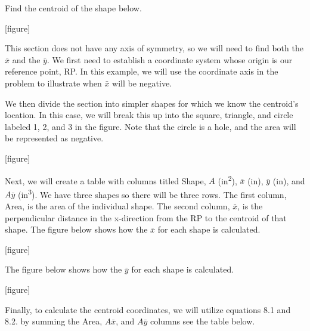 \documentclass[
  letterpaper,
  DIV=11,
  numbers=noendperiod]{scrreprt}
\begin{document}
\begin{tcolorbox}[enhanced jigsaw, breakable, opacityback=0, toptitle=1mm, left=2mm, colback=white, opacitybacktitle=0.6, colframe=quarto-callout-tip-color-frame, titlerule=0mm, arc=.35mm, leftrule=.75mm, bottomtitle=1mm, colbacktitle=quarto-callout-tip-color!10!white, rightrule=.15mm, title={Example 8.3}, bottomrule=.15mm, toprule=.15mm, coltitle=black]

Find the centroid of the shape below.

{[}figure{]}

\begin{tcolorbox}[enhanced jigsaw, breakable, opacityback=0, toptitle=1mm, left=2mm, colback=white, opacitybacktitle=0.6, colframe=quarto-callout-tip-color-frame, titlerule=0mm, arc=.35mm, leftrule=.75mm, bottomtitle=1mm, colbacktitle=quarto-callout-tip-color!10!white, rightrule=.15mm, title={Solution}, bottomrule=.15mm, toprule=.15mm, coltitle=black]

This section does not have any axis of symmetry, so we will need to find
both the \(\bar{x}\) and the \(\bar{y}\). We first need to establish a
coordinate system whose origin is our reference point, RP. In this
example, we will use the coordinate axis in the problem to illustrate
when \(\bar{x}\) will be negative.

We then divide the section into simpler shapes for which we know the
centroid's location. In this case, we will break this up into the
square, triangle, and circle labeled 1, 2, and 3 in the figure. Note
that the circle is a hole, and the area will be represented as negative.

{[}figure{]}

Next, we will create a table with columns titled Shape, \(A\)
(in\textsuperscript{2}), \(\bar{x}\) (in), \(\bar{y}\) (in), and
\(A\bar{y}\) (in\textsuperscript{3}). We have three shapes so there will
be three rows. The first column, Area, is the area of the individual
shape. The second column, \(\bar{x}\), is the perpendicular distance in
the x-direction from the RP to the centroid of that shape. The figure
below shows how the \(\bar{x}\) for each shape is calculated.

{[}figure{]}

The figure below shows how the \(\bar{y}\) for each shape is calculated.

{[}figure{]}

Finally, to calculate the centroid coordinates, we will utilize
equations 8.1 and 8.2. by summing the Area, \(A\bar{x}\), and
\(A\bar{y}\) columns see the table below.


\end{tcolorbox}
\end{tcolorbox}
\end{document}
